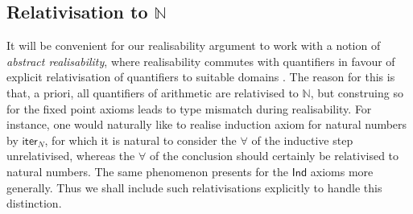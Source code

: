 \documentclass[10pt,a4paper]{amsart}
\theoremstyle{plain}
\theoremstyle{definition}
\renewcommand{\phi}{\varphi}
\theoremstyle{plain}
\theoremstyle{definition} %
\newcommand{\Nat}{\mathbb{N}}
\newcommand{\nat}{\mathit{N}}
\newcommand{\N}{\nat} %
\newcommand{\iter}[1]{\mathsf{iter}_{#1}}
\newcommand{\Niter}{\iter \N}
\renewcommand{\land}{\wedge}
\newcommand{\limp}{\to}
\newcommand{\preaxiom}{\mathsf{Pre}}
\newcommand{\indaxiom}{\mathsf{Ind}}
\newcommand{\pNat}{\mathsf{N}}
\newcommand{\pnat}[1]{\pNat\hspace{.05em} #1 }
\newcommand{\nattrans}[1]{#1^{\pNat}}
\begin{document}


\subsection{Relativisation to $\Nat$}
It will be convenient for our realisability argument to work with a notion of \emph{abstract realisability}, where realisability commutes with quantifiers in favour of explicit relativisation of quantifiers to suitable domains \cite{Troelstra98:realizability-handbook}.
The reason for this is that, a priori, all quantifiers of arithmetic are relativised to $\Nat$, but construing so for the fixed point axioms leads to type mismatch during realisability.
For instance, one would naturally like to realise induction axiom for natural numbers by $\Niter$, for which it is natural to consider the $\forall$ of the inductive step unrelativised, whereas the $\forall$ of the conclusion should certainly be relativised to natural numbers.
The same phenomenon presents for the $\indaxiom$ axioms more generally. 
Thus we shall include such relativisations explicitly to handle this distinction.
\end{document}
